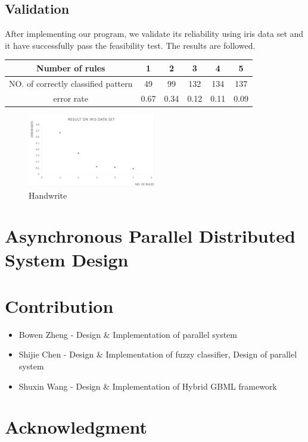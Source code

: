 \documentclass[conference]{IEEEtran}
\begin{document}
	 \subsection{Validation}
	 After implementing our program, we validate its reliability using iris data set and it have successfully pass the feasibility test. The results are followed.
	 \\
	 \begin{tabular}{cccccc}
	 	\hline
	 	Number of rules& 1& 2&3&4&5\\
	 	\hline
	 	NO. of correctly classified pattern& 49& 99&132&134&137\\
	 	\hline
	 	error rate&0.67&0.34&0.12&0.11&0.09\\
	 	\hline
	 \end{tabular}

 \begin{figure}[H]
 	\centering
 	\includegraphics[width=0.5\textwidth]{iris.png}
 	\caption{Handwrite}\label{fig:digit}
 \end{figure}
  \section{Asynchronous Parallel Distributed System Design}


  \section{Contribution}
    \begin{itemize}
    \item Bowen Zheng - Design \& Implementation of parallel system
    \item Shijie Chen - Design \& Implementation of fuzzy classifier, Design of parallel system
    \item Shuxin Wang - Design \& Implementation of Hybrid GBML framework
    \end{itemize}
    

  \section*{Acknowledgment}




\end{document}
